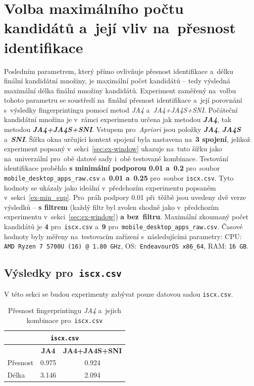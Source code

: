 \section{Volba maximálního počtu kandidátů a~její vliv na~přesnost identifikace}
Posledním parametrem, který přímo ovlivňuje přesnost identifikace a~délku finální kandidátní množiny, je maximální počet kandidátů -- tedy výsledná maximální délka finální množiny kandidátů. Experiment zaměřený na~volbu tohoto parametru se soustředí na~finální přesnost identifikace a~její porovnání s~výsledky fingerprintingu pomocí metod \textit{JA4} a~\textit{JA4+JA4S+SNI}. Počáteční kandidátní množina je v~rámci experimentu určena jak metodou \textbf{\textit{JA4}}, tak metodou \textbf{\textit{JA4+JA4S+SNI}}. Vstupem pro~\textit{Apriori} jsou položky \textbf{\textit{JA4}}, \textbf{\textit{JA4S}} a~\textbf{\textit{SNI}}. Šířka okna určující kontext spojení byla nastavena na~\textbf{3 spojení}, jelikož experiment popsaný v~sekci~\ref{sec:ex-window} ukazuje na~tuto šířku jako na~univerzální pro~obě datové sady i~obě testované kombinace. Testování identifikace proběhlo \textbf{s minimální podporou 0.01 a~0.2} pro~soubor \texttt{mobile\_desktop\_apps\_raw.csv} a~\textbf{0.01 a~0.25} pro~soubor \texttt{iscx.csv}. Tyto hodnoty se ukázaly jako ideální v~předchozím experimentu popsaném v~sekci~\ref{ex-min_sup}. Pro~práh podpory 0.01 při~těžbě jsou uvedeny dvě verze výsledků -- \textbf{s filtrem} (každý filtr byl zvolen shodně jako v~předchozím experimentu v~sekci~\ref{sec:ex-window}) \textbf{a bez~filtru}. Maximální zkoumaný počet kandidátů je \textbf{4} pro~\texttt{iscx.csv} a~\textbf{9} pro~\texttt{mobile\_desktop\_apps\_raw.csv}. Časové hodnoty byly měřeny na~testovacím zařízení s~následujícími parametry: CPU: \texttt{AMD Ryzen 7 5700U (16) @ 1.80 GHz}, OS:\texttt{ EndeavourOS x86\_64}, RAM: \texttt{16 GB}.

\subsection{Výsledky pro~\texttt{iscx.csv}}
V této sekci se budou experimenty zabývat pouze datovou sadou \texttt{iscx.csv}.
\begin{table}[H]
	\centering
	\begin{tabular}{lcc}
		\toprule
		\multicolumn{3}{c}{\texttt{iscx.csv}} \\
		\midrule
		          & \textbf{JA4} & \textbf{JA4+JA4S+SNI} \\
		\midrule
		Přesnost & 0.975        & 0.924                 \\
		Délka    & 3.146        & 2.094                 \\
		\bottomrule
	\end{tabular}
	\caption{Přesnost fingerprintingu \textit{JA4} a~jejich kombinace pro~\texttt{iscx.csv}}
	\label{tab:iscx-fingerprints-accuracy}
\end{table} 

